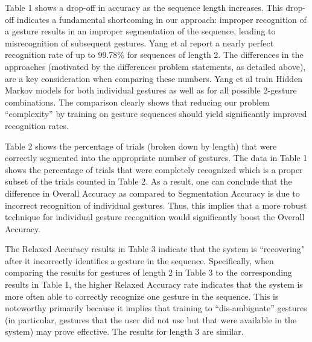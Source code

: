 \documentclass[twoside]{article}
\begin{document}
\begin{multicols}{2}
Table 1 shows a drop-off in accuracy as the sequence length increases. This
drop-off indicates a fundamental shortcoming in our approach: improper
recognition of a gesture results in an improper segmentation of the sequence, 
leading to misrecognition of subsequent gestures. 
Yang et al \cite{yang_gesture_1994} report a nearly perfect recognition rate of up to 99.78\% for sequences of length 2. The differences in the approaches (motivated by the differences problem statements, as detailed above), 
are a key consideration when comparing these numbers.
Yang et al train Hidden Markov models for both individual gestures as well as
for all possible 2-gesture combinations. The comparison clearly shows that reducing our problem ``complexity'' by training on gesture sequences should yield significantly improved recognition rates.

Table 2 shows the percentage of trials (broken down by length) that
were correctly segmented into the appropriate number of gestures. The data in
Table 1 shows the percentage of trials that were completely recognized which 
is a proper subset of the trials counted in
Table 2. As a result, one can conclude that the difference in Overall Accuracy
as compared to Segmentation Accuracy is due to incorrect recognition of
individual gestures. Thus, this implies that a more robust technique for
individual gesture recognition would significantly boost the Overall Accuracy.

The Relaxed Accuracy results in Table 3 indicate that the system is
``recovering" after it incorrectly identifies a gesture in the sequence.
Specifically, when comparing the results for gestures of length 2 in Table 3 to
the corresponding results in Table 1, the higher Relaxed Accuracy rate indicates
that the system is more often able to correctly recognize one gesture in the
sequence. This is noteworthy primarily because it implies that training to
``dis-ambiguate'' gestures (in particular, gestures that the user did not use
but that were available in the system) may prove effective. The results for
length 3 are similar.


\end{multicols}
\end{document}
